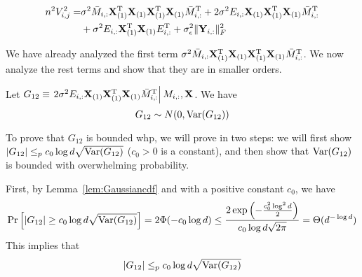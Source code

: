 \begin{equation}
\begin{split}
    n^2 V^2_{i,j} 
    =&  \sigma^2 \bar M_{i, :}\mathbf{X}_{(1)}^{\mathrm{T}}\mathbf{X}_{(1)}\mathbf{X}_{(1)}^{\mathrm{T}}\mathbf{X}_{(1)}\bar M^{\mathrm{T}}_{i, :}   + 2\sigma^2E_{i,:}\mathbf{X}_{(1)}\mathbf{X}^{\mathrm{T}}_{(1)}\mathbf{X}_{(1)}\bar M^{\mathrm{T}}_{i,:}  \\
    &+\sigma^2E_{i,:}\mathbf{X}_{(1)}^{\mathrm{T}}\mathbf{X}_{(1)}E^{\mathrm{T}}_{i,:} + \sigma^2_{\epsilon}\|\mathbf{Y}_{i,:}\|^2_F 
\end{split}
\end{equation}

We have already analyzed the first term $\sigma^2 \bar M_{i, :}\mathbf{X}_{(1)}^{\mathrm{T}}\mathbf{X}_{(1)}\mathbf{X}_{(1)}^{\mathrm{T}}\mathbf{X}_{(1)}\bar M^{\mathrm{T}}_{i, :}$. We now analyze the rest terms and show that they are in smaller orders. 




Let $G_{12} \equiv \left. 2\sigma^2E_{i,:}\mathbf{X}_{(1)}\mathbf{X}^{\mathrm{T}}_{(1)}\mathbf{X}_{(1)}\bar M^{\mathrm{T}}_{i,:}\right|M_{i,:},\mathbf{X}$. We have
\begin{equation}
    G_{12} \sim N(0,\mathrm{Var}(G_{12}))
\end{equation}

To prove that $G_{12}$ is bounded whp, we will prove in two steps: we will first show $|G_{12}| \leq_p c_0 \log d \sqrt{\mathrm{Var}(G_{12})}$ ($c_0>0$ is a constant), and then show that $\mathrm{Var}(G_{12})$ is bounded with overwhelming probability. 

First, by Lemma~\ref{lem:Gaussiancdf} and with a positive constant $c_0$, we have  
\begin{equation}
    \Pr \left[|G_{12}| \geq c_0 \log d\sqrt{\mathrm{Var}(G_{12})} \right] 
    =2 \Phi(-c_0 \log d) 
    \leq  \frac{2\exp \left( -\frac{c^2_0 \log^2 d}{2}\right)}{c_0 \log d \sqrt{2\pi} } 
    = \Theta(d^{-\log d})
\end{equation}
 This implies that
\begin{equation} \label{eqn:temp8}
    |G_{12}| \leq_p c_0 \log d \sqrt{\mathrm{Var}(G_{12})}
\end{equation}

